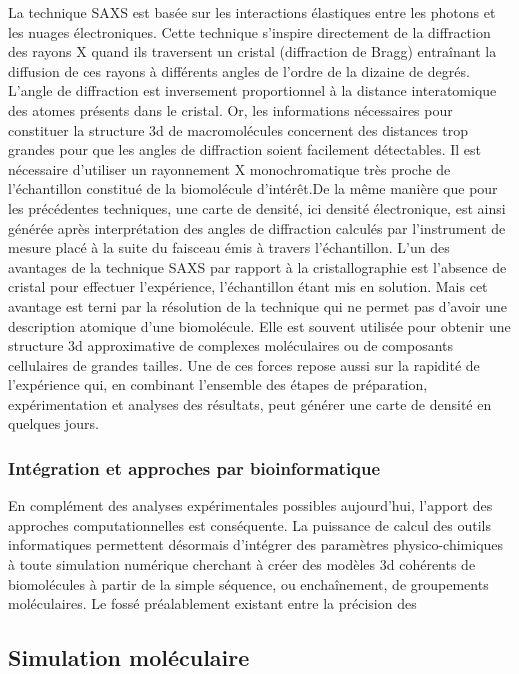 La technique SAXS est basée sur les interactions élastiques entre les photons et les nuages électroniques. Cette technique s'inspire directement de la diffraction des rayons X quand ils traversent un cristal (diffraction de Bragg) entraînant la diffusion de ces rayons à différents angles de l'ordre de la dizaine de degrés. L'angle de diffraction est inversement proportionnel à la distance interatomique des atomes présents dans le cristal. Or, les informations nécessaires pour constituer la structure 3d de macromolécules concernent des distances trop grandes pour que les angles de diffraction soient facilement détectables. Il est nécessaire d'utiliser un rayonnement X monochromatique très proche de l'échantillon constitué de la biomolécule d'intérêt.De la même manière que pour les précédentes techniques, une carte de densité, ici densité électronique, est ainsi générée après interprétation des angles de diffraction calculés par l'instrument de mesure placé à la suite du faisceau émis à travers l'échantillon.
L'un des avantages de la technique SAXS par rapport à la cristallographie est l'absence de cristal pour effectuer l'expérience, l'échantillon étant mis en solution. Mais cet avantage est terni par la résolution de la technique qui ne permet pas d'avoir une description atomique d'une biomolécule. Elle est souvent utilisée pour obtenir une structure 3d approximative de complexes moléculaires ou de composants cellulaires de grandes tailles. Une de ces forces repose aussi sur la rapidité de l'expérience qui, en combinant l'ensemble des étapes de préparation, expérimentation et analyses des résultats, peut générer une carte de densité en quelques jours.

\subsubsection{Intégration et approches par bioinformatique}


En complément des analyses expérimentales possibles aujourd'hui, l'apport des approches computationnelles est conséquente. La puissance de calcul des outils informatiques permettent désormais d'intégrer des paramètres physico-chimiques à toute simulation numérique cherchant à créer des modèles 3d cohérents de biomolécules à partir de la simple séquence, ou enchaînement, de groupements moléculaires. Le fossé préalablement existant entre la précision des 

\subsection{Simulation moléculaire}

